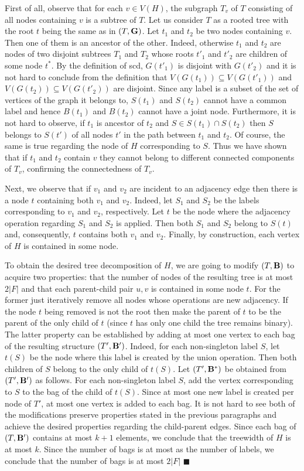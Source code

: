 \documentclass{llncs}
\begin{document}
First of all, observe that for each $v \in V(H)$, the subgraph $T_v$ of $T$
consisting of all nodes containing $v$ is a subtree of $T$. 
Let us consider $T$ as a rooted tree
with the root $t$ being the same as in $(T,{\bf G})$.
Let $t_1$ and $t_2$ be two nodes containing $v$. Then one of them
is an ancestor of the other. Indeed, otherwise $t_1$ and $t_2$ are nodes of two disjoint
subtrees $T_1$ and $T_2$ whose roots $t'_1$ and $t'_2$ are children of some node $t^*$.
By the definition of {\sc scd}, $G(t'_1)$ is disjoint with $G(t'_2)$ and it is
not hard to conclude from the definition that $V(G(t_1)) \subseteq V(G(t'_1))$ and 
$V(G(t_2)) \subseteq V(G(t'_2))$ are disjoint. Since any label is a subset of the set of vertices of 
the graph it belongs to, $S(t_1)$ and $S(t_2)$ cannot have a common label and hence
$B(t_1)$ and $B(t_2)$ cannot have a joint node. 
Furthermore, it is not hard to observe, if $t_1$ is ancestor of $t_2$ and $S \in S(t_1) \cap S(t_2)$ 
then $S$ belongs to $S(t')$ of all nodes $t'$ in the path between $t_1$ and $t_2$. Of course, the same
is true regarding the node of $H$ corresponding to $S$.
Thus we have shown that if $t_1$ and $t_2$ contain $v$ they cannot belong to different 
connected components of $T_v$, confirming the connectedness of $T_v$.

Next, we observe that if $v_1$ and $v_2$ are incident to an adjacency edge then
there is a node $t$ containing both $v_1$ and $v_2$. Indeed, let $S_1$ and $S_2$
be the labels corresponding to $v_1$ and $v_2$, respectively. Let $t$ be the node
where the adjacency operation regarding $S_1$ and $S_2$ is applied. Then both $S_1$
and $S_2$ belong to $S(t)$ and, consequently, $t$ contains both $v_1$ and $v_2$.
Finally, by construction, each vertex of $H$ is contained in some node.


To obtain the desired tree decomposition of $H$, we are going to modify $(T,{\bf B})$
to acquire two properties: that the number of nodes of the resulting tree is at most $2|F|$
and that each parent-child pair $u,v$ is contained in some node $t$. 
For the former just iteratively remove all nodes whose operations are new adjacency.
If the node $t$ being removed is not the root then make the parent of $t$ to be the parent
of the only child of $t$ (since $t$ has only one child the tree remains binary).
The latter property can be
established by adding at most one vertex to each bag of the resulting structure $(T',{\bf B'})$. Indeed,
for each non-singleton label $S$, let $t(S)$ be the node where this label is created by the union 
operation. Then both children of $S$ belong to the only child of $t(S)$.
Let $(T',{\bf B^*})$ be obtained from $(T',{\bf B'})$ as follows. For each non-singleton label
$S$, add the vertex corresponding to $S$ to the bag of the child of $t(S)$. Since at most one new label
is created per node of $T'$, at most one vertex is added to each bag. It is not hard to see 
both of the modifications preserve
properties stated in the previous paragraphs and achieve the desired properties regarding the child-parent edges.
Since each bag of $(T,{\bf B'})$ contains at most $k+1$ elements, we conclude that the treewidth of $H$
is at most $k$. Since the number of bags is at most as the number of labels, we conclude that the number of bags
is at most $2|F|$ $\blacksquare$
\end{document}
